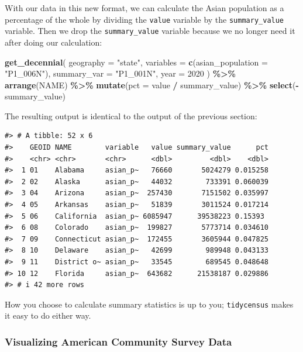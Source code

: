 \documentclass[
]{book}
\newenvironment{Shaded}{\begin{snugshade}}{\end{snugshade}}
\newcommand{\AttributeTok}[1]{\textcolor[rgb]{0.13,0.29,0.53}{#1}}
\newcommand{\DecValTok}[1]{\textcolor[rgb]{0.00,0.00,0.81}{#1}}
\newcommand{\FunctionTok}[1]{\textcolor[rgb]{0.13,0.29,0.53}{\textbf{#1}}}
\newcommand{\NormalTok}[1]{#1}
\newcommand{\SpecialCharTok}[1]{\textcolor[rgb]{0.81,0.36,0.00}{\textbf{#1}}}
\newcommand{\StringTok}[1]{\textcolor[rgb]{0.31,0.60,0.02}{#1}}
\begin{document}
With our data in this new format, we can calculate the Asian population as a percentage of the whole by dividing the \texttt{value} variable by the \texttt{summary\_value} variable. Then we drop the \texttt{summary\_value} variable because we no longer need it after doing our calculation:

\begin{Shaded}
\begin{Highlighting}[]
\FunctionTok{get\_decennial}\NormalTok{(}
  \AttributeTok{geography =} \StringTok{"state"}\NormalTok{,}
  \AttributeTok{variables =} \FunctionTok{c}\NormalTok{(}\AttributeTok{asian\_population =} \StringTok{"P1\_006N"}\NormalTok{),}
  \AttributeTok{summary\_var =} \StringTok{"P1\_001N"}\NormalTok{,}
  \AttributeTok{year =} \DecValTok{2020}
\NormalTok{) }\SpecialCharTok{\%\textgreater{}\%}
  \FunctionTok{arrange}\NormalTok{(NAME) }\SpecialCharTok{\%\textgreater{}\%}
  \FunctionTok{mutate}\NormalTok{(}\AttributeTok{pct =}\NormalTok{ value }\SpecialCharTok{/}\NormalTok{ summary\_value) }\SpecialCharTok{\%\textgreater{}\%}
  \FunctionTok{select}\NormalTok{(}\SpecialCharTok{{-}}\NormalTok{summary\_value)}
\end{Highlighting}
\end{Shaded}

The resulting output is identical to the output of the previous section:

\begin{verbatim}
#> # A tibble: 52 x 6
#>    GEOID NAME        variable   value summary_value      pct
#>    <chr> <chr>       <chr>      <dbl>         <dbl>    <dbl>
#>  1 01    Alabama     asian_p~   76660       5024279 0.015258
#>  2 02    Alaska      asian_p~   44032        733391 0.060039
#>  3 04    Arizona     asian_p~  257430       7151502 0.035997
#>  4 05    Arkansas    asian_p~   51839       3011524 0.017214
#>  5 06    California  asian_p~ 6085947      39538223 0.15393 
#>  6 08    Colorado    asian_p~  199827       5773714 0.034610
#>  7 09    Connecticut asian_p~  172455       3605944 0.047825
#>  8 10    Delaware    asian_p~   42699        989948 0.043133
#>  9 11    District o~ asian_p~   33545        689545 0.048648
#> 10 12    Florida     asian_p~  643682      21538187 0.029886
#> # i 42 more rows
\end{verbatim}

How you choose to calculate summary statistics is up to you; \texttt{tidycensus} makes it easy to do either way.

\hypertarget{visualizing-american-community-survey-data}{%
\subsubsection*{Visualizing American Community Survey Data}\label{visualizing-american-community-survey-data}}
\end{document}
